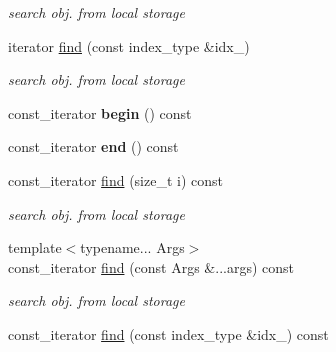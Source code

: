 \begin{DoxyCompactItemize}
\begin{DoxyCompactList}\small\item\em search obj. from local storage \item\end{DoxyCompactList}\item 
\hypertarget{classbtas_1_1_sp_tensor_adaa1debbebcd03900e53f2d9814d9b4e}{
iterator \hyperlink{classbtas_1_1_sp_tensor_adaa1debbebcd03900e53f2d9814d9b4e}{find} (const index\_\-type \&idx\_\-)}
\label{classbtas_1_1_sp_tensor_adaa1debbebcd03900e53f2d9814d9b4e}

\begin{DoxyCompactList}\small\item\em search obj. from local storage \item\end{DoxyCompactList}\item 
\hypertarget{classbtas_1_1_sp_tensor_a0fac2a0e84ec0e74daa600d69727085b}{
const\_\-iterator {\bfseries begin} () const }
\label{classbtas_1_1_sp_tensor_a0fac2a0e84ec0e74daa600d69727085b}

\item 
\hypertarget{classbtas_1_1_sp_tensor_a330620fb03e01a179ea35f77c37a3474}{
const\_\-iterator {\bfseries end} () const }
\label{classbtas_1_1_sp_tensor_a330620fb03e01a179ea35f77c37a3474}

\item 
\hypertarget{classbtas_1_1_sp_tensor_a03f826aa02a89caf646c5e66aa1f7899}{
const\_\-iterator \hyperlink{classbtas_1_1_sp_tensor_a03f826aa02a89caf646c5e66aa1f7899}{find} (size\_\-t i) const }
\label{classbtas_1_1_sp_tensor_a03f826aa02a89caf646c5e66aa1f7899}

\begin{DoxyCompactList}\small\item\em search obj. from local storage \item\end{DoxyCompactList}\item 
\hypertarget{classbtas_1_1_sp_tensor_a5a7b49f9b4a2cc04ad271ec1298fda06}{
{\footnotesize template$<$typename... Args$>$ }\\const\_\-iterator \hyperlink{classbtas_1_1_sp_tensor_a5a7b49f9b4a2cc04ad271ec1298fda06}{find} (const Args \&...args) const }
\label{classbtas_1_1_sp_tensor_a5a7b49f9b4a2cc04ad271ec1298fda06}

\begin{DoxyCompactList}\small\item\em search obj. from local storage \item\end{DoxyCompactList}\item 
\hypertarget{classbtas_1_1_sp_tensor_a79407de633b0fbf5afff45b529719e86}{
const\_\-iterator \hyperlink{classbtas_1_1_sp_tensor_a79407de633b0fbf5afff45b529719e86}{find} (const index\_\-type \&idx\_\-) const }
\label{classbtas_1_1_sp_tensor_a79407de633b0fbf5afff45b529719e86}


\end{DoxyCompactItemize}
